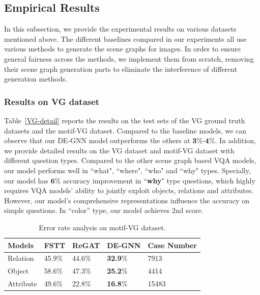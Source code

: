 \documentclass[letterpaper]{article} %
\begin{document}
\subsection{Empirical Results}
In this subsection, we provide the experimental results on various datasets mentioned above. 
The different baselines compared in our experiments all use various methods to generate the scene graphs for images. 
In order to ensure general fairness across the methods, we implement them from scratch, removing their scene graph generation parts to eliminate the interference of different generation methods.

\subsubsection{Results on VG dataset} Table~\ref{VG-detail} reports the results on the test sets of the VG ground truth datasets and the motif-VG dataset. Compared to the baseline models, we can observe that our DE-GNN model outperforms the others at $\textbf{3\%}$-$\textbf{4\%}$. In addition, we provide detailed results on the VG dataset and motif-VG dataset with different question types. Compared to the other scene graph based VQA models, our model performs well in ``what", ``where", ``who" and ``why" types. Specially, our model has $\textbf{6\%}$ accuracy improvement in ``\textbf{why}" type questions, which highly requires VQA models' ability to jointly exploit objects, relations and attributes. However, our model's comprehensive representations influence the accuracy on simple questions. In ``color'' type, our model achieves 2nd score.


\begin{table}
    \begin{tabular}{llll|l}
    \hline
     \textbf{Models} & FSTT & ReGAT & DE-GNN & Case Number \\
    \hline
     Relation & 45.9\% & 44.6\% & \textbf{32.9}\% & 7913\\
     Object &58.6\% & 47.3\% & \textbf{25.2}\% & 4414\\
     Attribute & 49.6\% & 22.8\% & \textbf{16.8}\% & 15483\\
    \hline
    \end{tabular}
\caption{\label{badcase}
Error rate analysis on motif-VG dataset. 
}
\end{table} 
\end{document}
